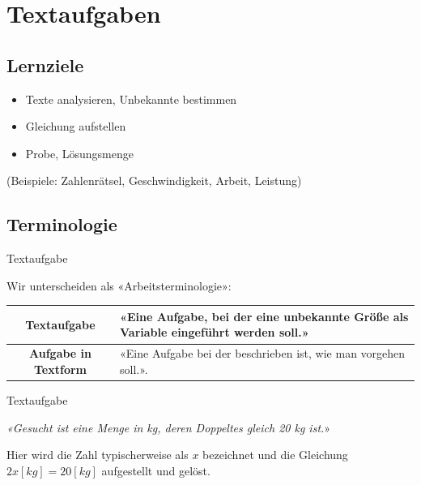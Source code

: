 \section{Textaufgaben}

\subsection*{Lernziele}

\begin{itemize}
\item Texte analysieren, Unbekannte bestimmen
\item Gleichung aufstellen
\item Probe, Lösungsmenge
\end{itemize}
(Beispiele: Zahlenrätsel, Geschwindigkeit, Arbeit, Leistung)

\newpage
\subsection{Terminologie}
\begin{bemerkung}{Textaufgabe}{}
  
  Wir unterscheiden als «Arbeitsterminologie»:

  \vspace{5mm}
  
  \begin{tabular}{c  | p{101mm}}%
    \textbf{Textaufgabe} &  «Eine Aufgabe, bei der eine unbekannte
    Größe als Variable eingeführt werden soll.» \\\hline%
    \textbf{Aufgabe in Textform} & «Eine Aufgabe bei der beschrieben
    ist, wie man vorgehen soll.».
  \end{tabular}%
  
\end{bemerkung}

\begin{beispiel}{Textaufgabe}{}

  \begin{center}
  {\textit{«Gesucht ist eine Menge in kg, deren Doppeltes
gleich 20 kg ist.}}»
  \end{center}
  
Hier wird die Zahl typischerweise als $x$ bezeichnet
und die Gleichung $2x [kg] =20 [kg]$ aufgestellt und gelöst.
\end{beispiel}

